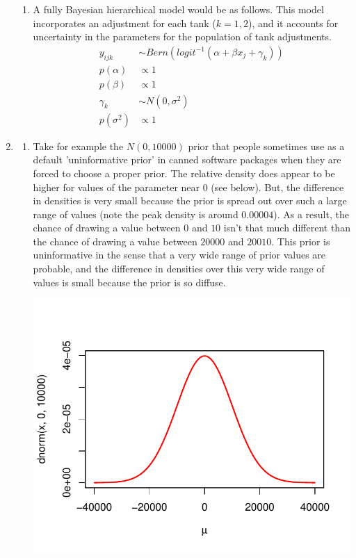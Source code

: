 \documentclass[12pt]{article}\usepackage[]{graphicx}\usepackage[]{color}
\newenvironment{knitrout}{}{} %
\begin{document}
\begin{enumerate}
\begin{enumerate}
\item A fully Bayesian hierarchical model would be as follows. This model incorporates an adjustment for each tank ($k=1,2$), and it accounts for uncertainty in the parameters for the population of tank adjustments.
\begin{align*}
y_{ijk} &\sim Bern(logit^{-1}(\alpha + \beta x_j + \gamma_k)) \\
p(\alpha) &\propto 1 \\
p(\beta) &\propto 1 \\
\gamma_k &\sim N(0, \sigma^2) \\
p(\sigma^2) &\propto 1
\end{align*}

\end{enumerate}

\item \begin{enumerate}

\item Take for example the $N(0, 10000)$ prior that people sometimes use as a default 'uninformative prior' in canned software packages when they are forced to choose a proper prior. The relative density does appear to be higher for values of the parameter near $0$ (see below). But, the difference in densities is very small because the prior is spread out over such a large range of values (note the peak density is around $0.00004$). As a result, the chance of drawing a value between $0$ and $10$ isn't that much different than the chance of drawing a value between $20000$ and $20010$. This prior is uninformative in the sense that a very wide range of prior values are probable, and the difference in densities over this very wide range of values is small because the prior is so diffuse.  

\begin{knitrout}\footnotesize
{}\color{fgcolor}
\includegraphics[width=.5\linewidth]{figure/stdprior-1} 


\end{knitrout}
\end{enumerate}
\end{enumerate}
\end{document}
